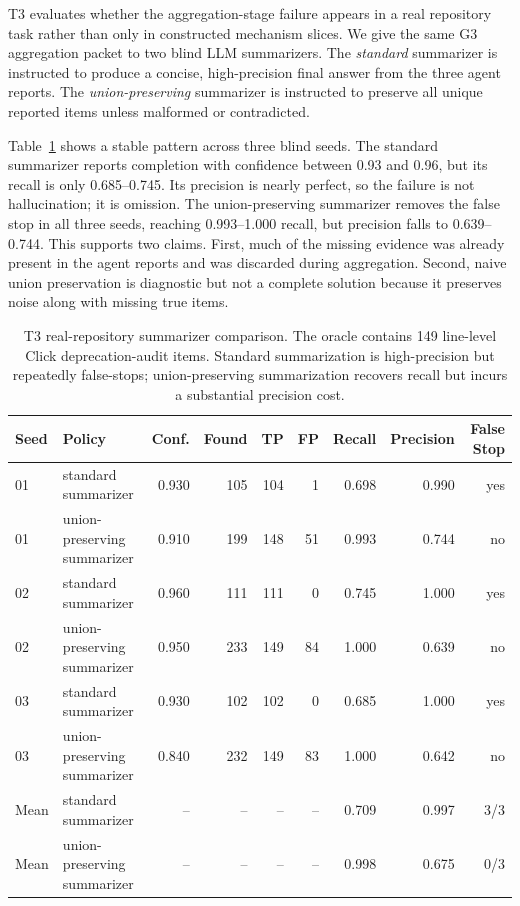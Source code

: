 \documentclass[letterpaper]{article}
\begin{document}
T3 evaluates whether the aggregation-stage failure appears in a real repository
task rather than only in constructed mechanism slices. We give the same G3
aggregation packet to two blind LLM summarizers. The \emph{standard} summarizer
is instructed to produce a concise, high-precision final answer from the three
agent reports. The \emph{union-preserving} summarizer is instructed to preserve
all unique reported items unless malformed or contradicted.

Table~\ref{tab:t3-summarizers} shows a stable pattern across three blind seeds.
The standard summarizer reports completion with confidence between 0.93 and
0.96, but its recall is only 0.685--0.745. Its precision is nearly perfect, so
the failure is not hallucination; it is omission. The union-preserving
summarizer removes the false stop in all three seeds, reaching 0.993--1.000
recall, but precision falls to 0.639--0.744. This supports two claims. First,
much of the missing evidence was already present in the agent reports and was
discarded during aggregation. Second, naive union preservation is diagnostic but
not a complete solution because it preserves noise along with missing true
items.

\begin{table}[t]
\centering
\small
\begin{tabular}{llrrrrrrr}
\toprule
Seed & Policy & Conf. & Found & TP & FP & Recall & Precision & False Stop \\
\midrule
01 & standard summarizer & 0.930 & 105 & 104 & 1 & 0.698 & 0.990 & yes \\
01 & union-preserving summarizer & 0.910 & 199 & 148 & 51 & 0.993 & 0.744 & no \\
02 & standard summarizer & 0.960 & 111 & 111 & 0 & 0.745 & 1.000 & yes \\
02 & union-preserving summarizer & 0.950 & 233 & 149 & 84 & 1.000 & 0.639 & no \\
03 & standard summarizer & 0.930 & 102 & 102 & 0 & 0.685 & 1.000 & yes \\
03 & union-preserving summarizer & 0.840 & 232 & 149 & 83 & 1.000 & 0.642 & no \\
\midrule
Mean & standard summarizer & -- & -- & -- & -- & 0.709 & 0.997 & 3/3 \\
Mean & union-preserving summarizer & -- & -- & -- & -- & 0.998 & 0.675 & 0/3 \\
\bottomrule
\end{tabular}
\caption{T3 real-repository summarizer comparison. The oracle contains 149
line-level Click deprecation-audit items. Standard summarization is
high-precision but repeatedly false-stops; union-preserving summarization
recovers recall but incurs a substantial precision cost.}
\label{tab:t3-summarizers}
\end{table}
\end{document}
